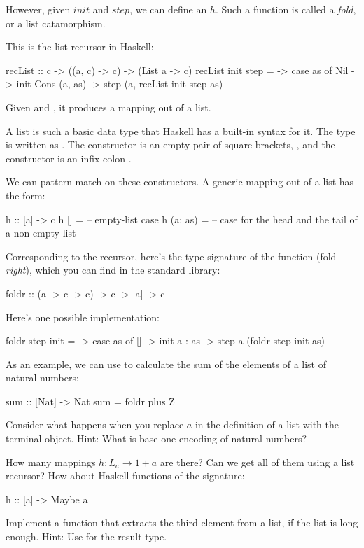 \documentclass[DaoFP]{subfiles}
\begin{document}
However, given $\mathit{init}$ and $\mathit{step}$, we can define an $h$. Such a function is called a \emph{fold}, or a list catamorphism. 

This is the list recursor in Haskell:
\begin{haskell}
recList :: c -> ((a, c) -> c) -> (List a -> c)
recList init step = \as ->
  case as of 
    Nil          -> init
    Cons (a, as) -> step (a, recList init step as)
\end{haskell}
Given  and , it produces a mapping out of a list.

A list is such a basic data type that Haskell has a built-in syntax for it. The type  is written as \hask{[a]}. The  constructor is an empty pair of square brackets, \hask{[]}, and the  constructor is an infix colon \hask{:}.

We can pattern-match on these constructors. A generic mapping out of a list has the form:
\begin{haskell}
h :: [a] -> c
h []      = -- empty-list case
h (a: as) = -- case for the head and the tail of a non-empty list
\end{haskell}

Corresponding to the recursor, here's the type signature of the function  (fold \emph{right}), which you can find in the standard library:
\begin{haskell}
foldr :: (a -> c -> c) -> c -> [a] -> c
\end{haskell}
Here's one possible implementation:
\begin{haskell}
foldr step init = \as ->
  case as of
    [] -> init
    a : as -> step a (foldr step init as)
\end{haskell}

As an example, we can use  to calculate the sum of the elements of a list of natural numbers:
\begin{haskell}
sum :: [Nat] -> Nat
sum = foldr plus Z
\end{haskell}


\begin{exercise}
Consider what happens when you replace $a$ in the definition of a list with the terminal object. Hint: What is base-one encoding of natural numbers?
\end{exercise}
\begin{exercise}
How many mappings $h \colon L_a \to 1 + a$ are there? Can we get all of them using a list recursor? How about Haskell functions of the signature:
\begin{haskell}
h :: [a] -> Maybe a
\end{haskell}
\end{exercise}
\begin{exercise}
Implement a function that extracts the third element from a list, if the list is long enough. Hint: Use  for the result type.
\end{exercise}
\end{document}
